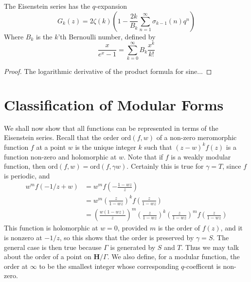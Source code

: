 \begin{theorem}
    The Eisenstein series has the $q$-expansion
    \[ G_k(z) = 2 \zeta(k) \left( 1 - \frac{2k}{B_k} \sum_{n = 1}^\infty \sigma_{k-1}(n) q^n \right) \]
    Where $B_k$ is the $k$'th Bernoulli number, defined by
    \[ \frac{x}{e^x - 1} = \sum_{k = 0}^\infty B_k \frac{x^k}{k!} \]
\end{theorem}
\begin{proof}
    The logarithmic derivative of the product formula for sine...
\end{proof}

\section{Classification of Modular Forms}

We shall now show that all functions can be represented in terms of the Eisenstein series. Recall that the order $\text{ord}(f,w)$ of a non-zero meromorphic function $f$ at a point $w$ is the unique integer $k$ such that $(z - w)^k f(z)$ is a function non-zero and holomorphic at $w$. Note that if $f$ is a weakly modular function, then $\text{ord}(f,w) = \text{ord}(f, \gamma w)$. Certainly this is true for $\gamma = T$, since $f$ is periodic, and
%
\begin{align*}
    w^m f(-1/z + w) &= w^m f\left( -\frac{1-wz}{z} \right)\\
    &= w^m \left( \frac{z}{1 - wz} \right)^k f \left( \frac{z}{1 - wz} \right)\\
    &= \left( \frac{w (1 - wz)}{z} \right)^m \left( \frac{z}{1 - wz} \right)^k \left( \frac{z}{1 - wz} \right)^m f\left( \frac{z}{1 - wz} \right)
\end{align*}
%
This function is holomorphic at $w = 0$, provided $m$ is the order of $f(z)$, and it is nonzero at $-1/z$, so this shows that the order is preserved by $\gamma = S$. The general case is then true because $\Gamma$ is generated by $S$ and $T$. Thus we may talk about the order of a point on $\mathbf{H} / \Gamma$. We also define, for a modular function, the order at $\infty$ to be the smallest integer whose corresponding $q$-coefficent is non-zero.


